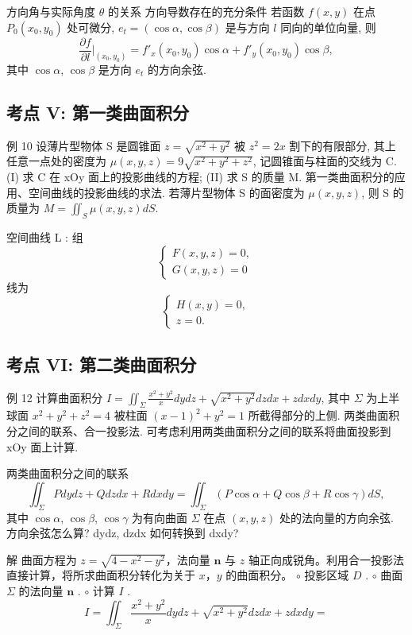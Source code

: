 方向角与实际角度 \(\theta\) 的关系
方向导数存在的充分条件
若函数 \(f(x,y)\) 在点 \(P_0(x_0,y_0)\) 处可微分, \(e_t = (\cos \alpha, \cos \beta)\) 是与方向 \(l\) 同向的单位向量, 则
\[ \frac{\partial f}{\partial l} \bigg|_{(x_0, y_0)} = f'_x(x_0, y_0) \cos \alpha + f'_y(x_0, y_0) \cos \beta, \]
其中 \(\cos \alpha\), \(\cos \beta\) 是方向 \(e_t\) 的方向余弦.


\subsection*{考点 V: 第一类曲面积分}

例 10
设薄片型物体 S 是圆锥面 \(z = \sqrt{x^2 + y^2}\) 被 \(z^2 = 2x\) 割下的有限部分, 其上任意一点处的密度为 \(\mu(x, y, z) = 9\sqrt{x^2 + y^2 + z^2}\), 记圆锥面与柱面的交线为 C.
(I) 求 C 在 xOy 面上的投影曲线的方程;
(II) 求 S 的质量 M.
第一类曲面积分的应用、空间曲线的投影曲线的求法.
若薄片型物体 S 的面密度为 \(\mu(x, y, z)\), 则 S 的质量为 \(M = \iint_S \mu(x, y, z) dS\).

空间曲线 L :
组
\[
\begin{cases}
F(x, y, z) = 0, \\
G(x, y, z) = 0
\end{cases}
\]
线为
\[
\begin{cases}
H(x, y) = 0, \\
z = 0.
\end{cases}
\]


\subsection*{考点 VI: 第二类曲面积分}

例 12
计算曲面积分 \(I = \iint_{\Sigma} \frac{x^2 + y^2}{x} dy dz + \sqrt{x^2 + y^2} dz dx + z dx dy\), 其中 \(\Sigma\) 为上半球面 \(x^2 + y^2 + z^2 = 4\) 被柱面 \((x-1)^2 + y^2 = 1\) 所截得部分的上侧.
两类曲面积分之间的联系、合一投影法.
可考虑利用两类曲面积分之间的联系将曲面投影到 xOy 面上计算.

两类曲面积分之间的联系
\[ \iint_{\Sigma} P dy dz + Q dz dx + R dx dy = \iint_{\Sigma} (P \cos \alpha + Q \cos \beta + R \cos \gamma) dS, \]
其中 \(\cos \alpha\), \(\cos \beta\), \(\cos \gamma\) 为有向曲面 \(\Sigma\) 在点 \((x, y, z)\) 处的法向量的方向余弦.
方向余弦怎么算? dydz, dzdx 如何转换到 dxdy?

解 曲面方程为 \(z = \sqrt{4 - x^2 - y^2}\)，法向量 \(\mathbf{n}\) 与 \(z\) 轴正向成锐角。利用合一投影法直接计算，将所求曲面积分转化为关于 \(x\)，\(y\) 的曲面积分。
$\circ$ 投影区域 \(D\) .
$\circ$ 曲面 \(\Sigma\) 的法向量 \(\mathbf{n}\) .
$\circ$ 计算 \(I\) .
\[I = \iint_{\Sigma} \frac{x^2 + y^2}{x} dy dz + \sqrt{x^2 + y^2} dz dx + z dx dy =\]

